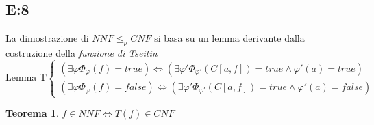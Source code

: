 \documentclass[a4paper]{article}
\newtheorem*{theorem}{Teorema}
\newcommand{\red}{\leq_p}
\begin{document}
\subsection{E:8}
La dimostrazione di $NNF \red CNF$ si basa su un lemma derivante dalla costruzione della \textit{funzione di Tseitin}
\begin{equation*}
	\text{Lemma T}\begin{cases}
		(\exists \varphi \Phi_\varphi(f) = true) \Leftrightarrow (\exists \varphi' \Phi_{\varphi'}(C[a,f]) = true \land \varphi'(a) = true)\\
		(\exists \varphi \Phi_\varphi(f) = false) \Leftrightarrow (\exists \varphi' \Phi_{\varphi'}(C[a,f]) = true \land \varphi'(a) = false)
	\end{cases}
\end{equation*}
\begin{theorem}
	$f \in NNF \Leftrightarrow T(f) \in CNF$ 
\end{theorem}
\end{document}
